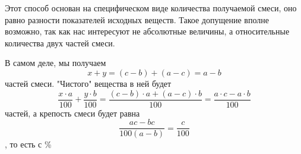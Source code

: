 \documentclass[a4paper,12pt]{article}
\begin{document}
\begin{multicols}{2}
{Этот способ основан на специфическом виде количества получаемой смеси, оно равно разности показателей исходных веществ. Такое допущение вполне возможно, так как нас интересуют не абсолютные величины, а относительные количества двух частей смеси.

В самом деле, мы получаем
$$
x + y = (c - b) + (a - c) = a - b
$$
частей смеси. "Чистого" вещества в ней будет
$$
\frac{x \cdot a}{100} + \frac{y \cdot b}{100} = \frac{(c - b) \cdot a + (a - c) \cdot b}{100} = \frac{a \cdot c - a \cdot b}{100}
$$
частей, а крепость смеси будет равна
$$
\frac{ac - bc}{100(a-b)} = \frac{c}{100}
$$, то есть с \%
} %
\end{multicols}
\end{document}
